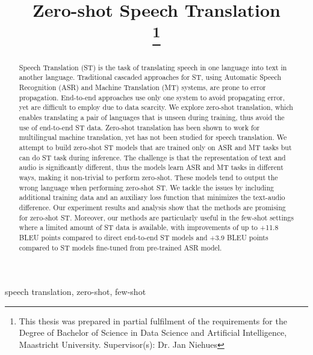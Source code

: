 \documentclass[conference]{IEEEtran}
\begin{document}
	
	\title{Zero-shot Speech Translation \\
		\thanks{This thesis was prepared in partial fulfilment of the requirements for the Degree of Bachelor of Science in Data Science and Artificial Intelligence, Maastricht University. Supervisor(s): Dr. Jan Niehues}
	}
	
	\author{
	}
	
	\maketitle
	
	\begin{abstract}
		Speech Translation (ST) is the task of translating speech in one language into text in another language. Traditional cascaded approaches for ST, using Automatic Speech Recognition (ASR) and Machine Translation (MT) systems, are prone to error propagation. End-to-end approaches use only one system to avoid propagating error, yet are difficult to employ due to data scarcity. We explore zero-shot translation, which enables translating a pair of languages that is unseen during training, thus avoid the use of end-to-end ST data. Zero-shot translation has been shown to work for multilingual machine translation, yet has not been studied for speech translation. We attempt to build zero-shot ST models that are trained only on ASR and MT tasks but can do ST task during inference. The challenge is that the representation of text and audio is significantly different, thus the models learn ASR and MT tasks in different ways, making it non-trivial to perform zero-shot. These models tend to output the wrong language when performing zero-shot ST. We tackle the issues by including additional training data and an auxiliary loss function that minimizes the text-audio difference. Our experiment results and analysis show that the methods are promising for zero-shot ST. Moreover, our methods are particularly useful in the few-shot settings where a limited amount of ST data is available, with improvements of up to +11.8 BLEU points compared to direct end-to-end ST models and +3.9 BLEU points compared to ST models fine-tuned from pre-trained ASR model.
	\end{abstract}
	
	\begin{IEEEkeywords}
		speech translation, zero-shot, few-shot
	\end{IEEEkeywords}
	
\end{document}
